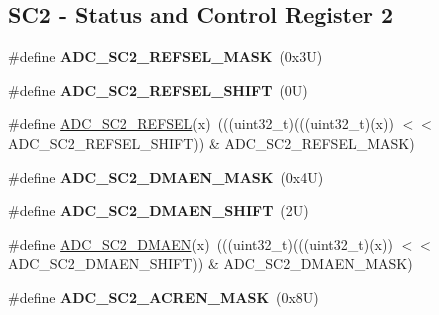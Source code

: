 \subsection*{S\+C2 -\/ Status and Control Register 2}
\begin{DoxyCompactItemize}
\item 
\mbox{\label{group___a_d_c___register___masks_gaa821d1e2e4575c757e9446da61b2230a}} 
\#define {\bfseries A\+D\+C\+\_\+\+S\+C2\+\_\+\+R\+E\+F\+S\+E\+L\+\_\+\+M\+A\+SK}~(0x3\+U)
\item 
\mbox{\label{group___a_d_c___register___masks_gaab9b293eb54de2d9d246766002e44556}} 
\#define {\bfseries A\+D\+C\+\_\+\+S\+C2\+\_\+\+R\+E\+F\+S\+E\+L\+\_\+\+S\+H\+I\+FT}~(0\+U)
\item 
\#define \mbox{\hyperlink{group___a_d_c___register___masks_gacac3b41d5c2bb74a8c614f200f0c0a36}{A\+D\+C\+\_\+\+S\+C2\+\_\+\+R\+E\+F\+S\+EL}}(x)~(((uint32\+\_\+t)(((uint32\+\_\+t)(x)) $<$$<$ A\+D\+C\+\_\+\+S\+C2\+\_\+\+R\+E\+F\+S\+E\+L\+\_\+\+S\+H\+I\+FT)) \& A\+D\+C\+\_\+\+S\+C2\+\_\+\+R\+E\+F\+S\+E\+L\+\_\+\+M\+A\+SK)
\item 
\mbox{\label{group___a_d_c___register___masks_ga50fc5fed4844c3ceb8da9b595029da11}} 
\#define {\bfseries A\+D\+C\+\_\+\+S\+C2\+\_\+\+D\+M\+A\+E\+N\+\_\+\+M\+A\+SK}~(0x4\+U)
\item 
\mbox{\label{group___a_d_c___register___masks_ga5554f538c0c6d7b3e2dfa502fdfed488}} 
\#define {\bfseries A\+D\+C\+\_\+\+S\+C2\+\_\+\+D\+M\+A\+E\+N\+\_\+\+S\+H\+I\+FT}~(2\+U)
\item 
\#define \mbox{\hyperlink{group___a_d_c___register___masks_ga8917f7dbaa5ca1d78f2fddb82a9e004d}{A\+D\+C\+\_\+\+S\+C2\+\_\+\+D\+M\+A\+EN}}(x)~(((uint32\+\_\+t)(((uint32\+\_\+t)(x)) $<$$<$ A\+D\+C\+\_\+\+S\+C2\+\_\+\+D\+M\+A\+E\+N\+\_\+\+S\+H\+I\+FT)) \& A\+D\+C\+\_\+\+S\+C2\+\_\+\+D\+M\+A\+E\+N\+\_\+\+M\+A\+SK)
\item 
\mbox{\label{group___a_d_c___register___masks_ga25f7f0c6a6513cbfbd4684513b373f9c}} 
\#define {\bfseries A\+D\+C\+\_\+\+S\+C2\+\_\+\+A\+C\+R\+E\+N\+\_\+\+M\+A\+SK}~(0x8\+U)
\item 
\mbox{\label{group___a_d_c___register___masks_ga34954b7e5cb86e290b281e2f97b63187}} 

\end{DoxyCompactItemize}

